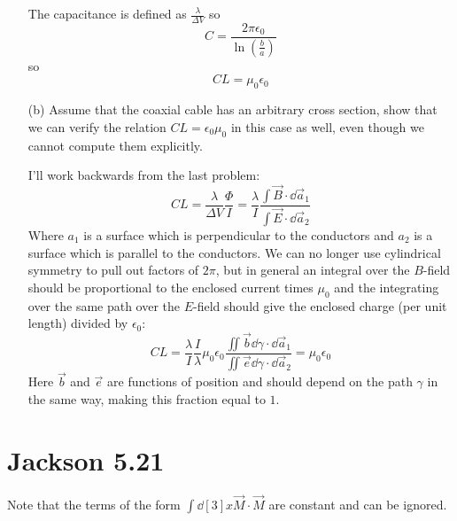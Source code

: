 \documentclass[a4paper,twoside]{article}
\begin{document}
\begin{itemize}
\begin{problem}
\begin{equation}
            \end{equation}
            The capacitance is defined as $ \frac{\lambda}{\Delta V} $ so
            \begin{equation}
                C = \frac{2 \pi \epsilon_0}{\ln(\frac{b}{a})}
            \end{equation}
            so
            \begin{equation}
                CL = \mu_0 \epsilon_0
            \end{equation}
        \end{problem}
    \item[(b)] Assume that the coaxial cable has an arbitrary cross section, show that we can verify the relation $ CL = \epsilon_0 \mu_0 $ in this case as well, even though we cannot compute them explicitly.
        \begin{problem}
            I'll work backwards from the last problem:
            \begin{equation}
                CL = \frac{\lambda}{\Delta V} \frac{\Phi}{I} = \frac{\lambda}{I} \frac{\int \vec{B} \cdot \dd{ \vec{a}_1}}{\int \vec{E} \cdot \dd{ \vec{a}_2}}
            \end{equation}
            Where $ a_1 $ is a surface which is perpendicular to the conductors and $ a_2 $ is a surface which is parallel to the conductors. We can no longer use cylindrical symmetry to pull out factors of $ 2 \pi $, but in general an integral over the $ B $-field should be proportional to the enclosed current times $ \mu_0 $  and the integrating over the same path over the $ E $-field should give the enclosed charge (per unit length) divided by $ \epsilon_0 $:
            \begin{equation}
                CL = \frac{\lambda}{I} \frac{I}{\lambda} \mu_0 \epsilon_0 \frac{\iint \vec{b} \dd{\gamma} \cdot \dd{ \vec{a}_1}}{\iint \vec{e} \dd{\gamma } \cdot \dd{ \vec{a}_2}} = \mu_0 \epsilon_0
            \end{equation}
            Here $ \vec{b} $ and $ \vec{e} $ are functions of position and should depend on the path $ \gamma $ in the same way, making this fraction equal to $ 1 $.
        \end{problem}
\end{itemize}

\section{Jackson 5.21}
Note that the terms of the form $ \int \dd[3]{x} \vec{M} \cdot \vec{M} $ are constant and can be ignored.
\end{document}
